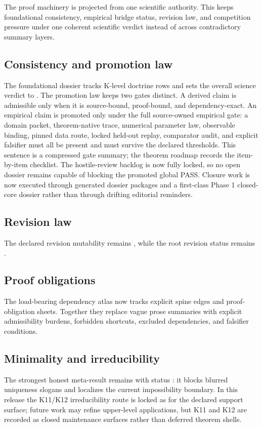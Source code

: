 The proof machinery is projected from one scientific authority. This keeps foundational consistency, empirical bridge status, revision law, and competition pressure under one coherent scientific verdict instead of across contradictory summary layers.

\subsection{Consistency and promotion law}
The foundational dossier tracks  K-level doctrine rows and sets the overall science verdict to .
The promotion law keeps two gates distinct. A derived claim is admissible only when it is source-bound, proof-bound, and dependency-exact. An empirical claim is promoted only under the full source-owned empirical gate: a domain packet, theorem-native trace, numerical parameter law, observable binding, pinned data route, locked held-out replay, comparator audit, and explicit falsifier must all be present and must survive the declared thresholds. This sentence is a compressed gate summary; the theorem roadmap records the item-by-item checklist.
The hostile-review backlog is now fully locked, so no open dossier remains capable of blocking the promoted global PASS.
Closure work is now executed through generated dossier packages and a first-class Phase 1 closed-core dossier rather than through drifting editorial reminders.

\subsection{Revision law}
The declared revision mutability remains , while the root revision status remains .

\subsection{Proof obligations}
The load-bearing dependency atlas now tracks  explicit spine edges and  proof-obligation sheets. Together they replace vague prose summaries with explicit admissibility burdens, forbidden shortcuts, excluded dependencies, and falsifier conditions.

\subsection{Minimality and irreducibility}
The strongest honest meta-result remains  with status : it blocks blurred uniqueness slogans and localizes the current impossibility boundary. In this release the K11/K12 irreducibility route is locked as  for the declared support surface; future work may refine upper-level applications, but K11 and K12 are recorded as closed maintenance surfaces rather than deferred theorem shells.


